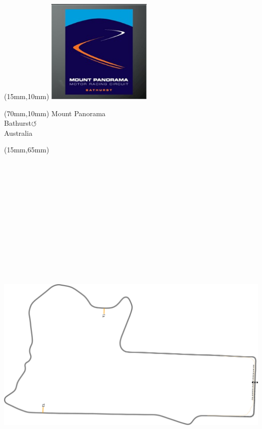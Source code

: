 \null\newpage
\begin{textblock*}{50mm}(15mm,10mm)%
\includegraphics[width=50mm]{LG/2015-05-20_00087.png}
\end{textblock*}
\begin{textblock*}{130mm}(70mm,10mm)%
{\fontsize{20}{20}\selectfont Mount Panorama\\}
{\fontsize{16}{16}\selectfont Bathurst\hfill \huge$\circlearrowleft$\\}
{\fontsize{12}{12}\selectfont Australia\\}
\end{textblock*}
\begin{textblock*}{185mm}(15mm,65mm)%
\centering
\mbox{\includegraphics[width=185mm,height=210mm,keepaspectratio]{PT/BA.pdf}}
\end{textblock*}
